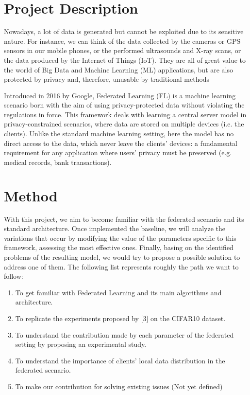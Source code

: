 \documentclass{article}
\begin{document}
	
	
\section{Project Description}

Nowadays, a lot of data is generated but cannot be exploited due to its sensitive nature. For
instance, we can think of the data collected by the cameras or GPS sensors in our mobile phones,
or the performed ultrasounds and X-ray scans, or the data produced by the Internet of Things
(IoT). They are all of great value to the world of Big Data and Machine Learning (ML) applications,
but are also protected by privacy and, therefore, unusable by traditional methods


Introduced in 2016 by Google, Federated Learning (FL) is a machine learning scenario born with
the aim of using privacy-protected data without violating the regulations in force. This framework
deals with learning a central server model in privacy-constrained scenarios, where data are
stored on multiple devices (i.e. the clients). Unlike the standard machine learning setting, here the
model has no direct access to the data, which never leave the clients’ devices: a fundamental
requirement for any application where users’ privacy must be preserved (e.g. medical records,
bank transactions).



\section{Method}
With this project, we aim to become familiar with the federated scenario and its standard architecture. Once implemented the baseline, we will analyze the variations that occur by modifying the value of the parameters specific to this framework, assessing the most effective ones. Finally, basing on the identified problems of the resulting model, we would try to propose a possible solution to address one of them. The following list represents roughly the path we want to follow:

\begin{enumerate}
    \item To get familiar with Federated Learning and its main algorithms and architecture.
    \item  To replicate the experiments proposed by [3] on the CIFAR10 dataset.
    \item To understand the contribution made by each parameter of the federated setting by
proposing an experimental study.
\item To understand the importance of clients’ local data distribution in the federated scenario. 
\item To make our contribution for solving existing issues (Not yet defined)
\end{enumerate}
\end{document}
